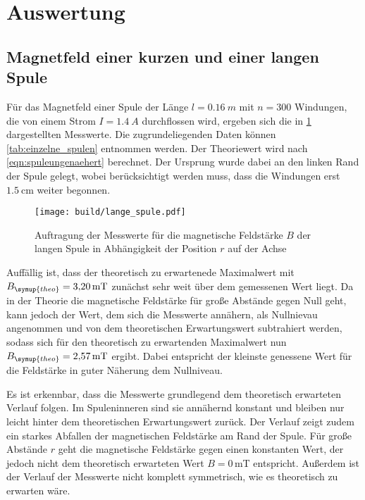 \section{Auswertung}
\label{sec:Auswertung}

\subsection{Magnetfeld einer kurzen und einer langen Spule}

Für das Magnetfeld einer Spule der Länge $l=\SI{0,16}{m}$ mit $n=300$ Windungen,
die von einem Strom $I=\SI{1,4}{A}$ durchflossen wird, ergeben sich die in
\ref{fig:lange_spule} dargestellten Messwerte. Die zugrundeliegenden Daten können
\ref{tab:einzelne_spulen} entnommen werden. Der Theoriewert wird nach \ref{eqn:spuleungenaehert} berechnet.
Der Ursprung wurde dabei an den linken Rand der Spule gelegt, wobei berücksichtigt werden
muss, dass die Windungen erst $\SI{1,5}{\centi\metre}$ weiter begonnen.

\begin{figure}
  \centering
  \texttt{[image: build/lange\_spule.pdf]}
  \caption{Auftragung der Messwerte für die magnetische Feldstärke $B$ der langen Spule
  in Abhängigkeit der Position $r$ auf der Achse}
  \label{fig:lange_spule}
\end{figure}

Auffällig ist, dass der theoretisch zu erwartenede Maximalwert mit $B_{\symup{theo}}=\SI{3,20}{\milli\tesla}$
zunächst sehr weit über dem gemessenen Wert liegt. Da in der Theorie die magnetische
Feldstärke für große Abstände gegen Null geht, kann jedoch der Wert, dem sich die
Messwerte annähern, als Nullnievau angenommen und von dem theoretischen Erwartungswert
subtrahiert werden, sodass sich für den theoretisch zu erwartenden Maximalwert nun
$B_{\symup{theo}}=\SI{2,57}{\milli\tesla}$ ergibt. Dabei entspricht der kleinste genessene Wert für die Feldstärke
in guter Näherung dem Nullniveau.

Es ist erkennbar, dass die Messwerte grundlegend dem theoretisch erwarteten Verlauf folgen.
Im Spuleninneren sind sie annähernd konstant und bleiben nur leicht hinter dem
theoretischen Erwartungswert zurück. Der Verlauf zeigt zudem ein starkes Abfallen
der magnetischen Feldstärke am Rand der Spule. Für große Abstände $r$ geht die magnetische
Feldstärke gegen einen konstanten Wert, der jedoch nicht dem theoretisch erwarteten
Wert $B=0$\,mT entspricht. Außerdem ist der Verlauf der Messwerte nicht komplett symmetrisch,
wie es theoretisch zu erwarten wäre.


